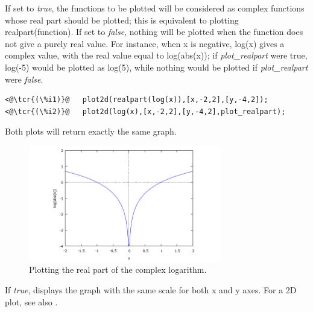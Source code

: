 \documentclass[../Maxima_Workbook.tex]{subfiles}
\begin{document}
\lzz {} \qquad {} \hfill {}

\lz If set to \emph{true}, the functions to be plotted will be considered as complex functions whose real part should be plotted; this is equivalent to plotting realpart(function). If set to \emph{false}, nothing will be plotted when the function does not give a purely real value. For instance, when x is negative, log(x) gives a complex value, with the real value equal to log(abs(x)); if \emph{plot\_realpart} were true, log(-5) would be plotted as log(5), while nothing would be plotted if \emph{plot\_realpart} were \emph{false}.

\lz \begin{lstlisting}
<@\tcr{(\%i1)}@   plot2d(realpart(log(x)),[x,-2,2],[y,-4,2]);
<@\tcr{(\%i2)}@   plot2d(log(x),[x,-2,2],[y,-4,2],plot_realpart);
\end{lstlisting}
\vspace{-2mm} 

\lz Both plots will return exactly the same graph.

\begin{figure}
	\centering
	\includegraphics[width=0.75\textwidth]{Pl_plot_realpart.png}
	\caption{Plotting the real part of the complex logarithm.}
	\label{Pl-Fig5}
\end{figure}

\lzz {} \qquad {} \hfill {}

\lz If \emph{true}, displays the graph with the same scale for both x and y axes. For a 2D plot, see also .

\lzz {} \hfill {}
\end{document}
